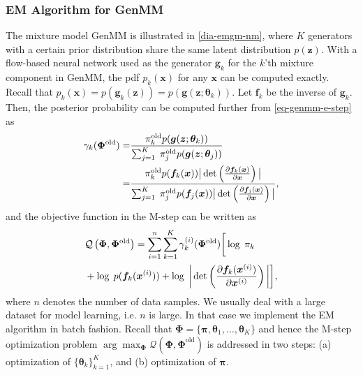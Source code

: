\subsubsection{EM Algorithm for GenMM}
\label{sec-algo-genmm}
The mixture model GenMM is illustrated in \autoref{dia-emgm-nm},
where $K$ generators with a certain prior distribution share the same
latent distribution $p(\bm{z})$. With a flow-based neural network used as the generator $\bm{g}_k$ for the $k$'th mixture component in GenMM, the pdf $p_k(\bm{x})$ for any
$\bm{x}$ can be computed exactly. Recall that $p_k(\bm{x}) =  p(\bm{g}_k(\bm{z})) =p(\bm{g}(\bm{z};\bm{\theta}_k))$. Let $\bm{f}_k$ be the inverse of $\bm{g}_k$. Then, %
the posterior probability can be computed further from \autoref{eq-genmm-e-step} as
\begin{align}\label{eq-genmm-gamma}
  \gamma_k({\bm{\Phi}}^{\mathrm{old}}) %
  = & \frac{\pi_k^{\mathrm{old}} p(\bm{g}(\bm{z};\bm{\theta}_k))}{\sum_{j=1}^K\;
      \pi_j^{\mathrm{old}} p(\bm{g}(\bm{z};\bm{\theta}_j))} \nonumber\\
  = &\frac{\pi_k^{\mathrm{old}} p(\bm{f}_k(\bm{x})) \big|\det\left( \pd{\bm{f}_k(\bm{x})}{\bm{x}} \right)\big|}{\sum_{j=1}^K\; \pi_j^{\mathrm{old}} p(\bm{f}_j(\bm{x})) \big|\det\left( \pd{\bm{f}_j(\bm{x})}{\bm{x}} \right)\big|},
\end{align}
and the objective function in the M-step can be written as
\begin{align}\label{eq-genmm-obj}
  &\mathcal{Q}\left(\bm{\Phi},\bm{\Phi}^{\mathrm{old}}\right)  =\sum_{i=1}^n \sum_{k=1}^{K}\gamma_k^{(i)}(\bm{\Phi}^{\mathrm{old}})\bigg[ \log\;\pi_k 
    \nonumber\\ &+\log\;p(\bm{f}_k(\bm{x}^{(i)})) 
                  + \log\;\bigg|\det\left(\frac{ \partial \bm{f}_k(\bm{x}^{(i)})}{\partial \bm{x}^{(i)}} \right)\bigg|\bigg],
\end{align}
where $n$ denotes the number of data samples. We usually deal with a large dataset for model learning, i.e. $n$ is large. In that case we implement the EM algorithm in batch fashion. 
Recall that $ \bm{\Phi}= \{\bm{\pi},\bm{\theta}_1, \dots, \bm{\theta}_K \}$ and hence the M-step optimization problem $\arg \max_{\bm{\Phi}} \mathcal{Q} (\bm{\Phi},\bm{\Phi}^{\mathrm{old}})$ is addressed in two steps: (a) optimization of $\{ \bm{\theta}_k \}_{k=1}^{K}$, and (b) optimization of $\bm{\pi}$.


